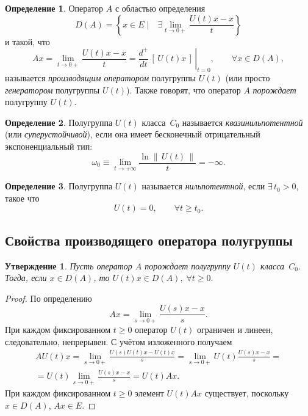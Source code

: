 \documentclass{article}
\renewcommand{\ge}{\geqslant}
\newtheorem{statement}{Утверждение}
\theoremstyle{definition}
\newtheorem{definition}{Определение}
\begin{document}
\begin{definition} \label{generator}
	Оператор $A$ с областью определения
	\begin{equation*}
		D(A) = \left\{ x \in E \; \bigg| \quad \exists \lim\limits_{t \rightarrow 0+} \frac{U(t)x - x}{t} \right\} 
	\end{equation*}
	и такой, что
	\begin{equation*}
		Ax = \lim\limits_{t \rightarrow 0+} \frac{U(t)x - x}{t} = \left. \frac{d^+}{dt}\,[\, U(t) x \,] \,\right|_{t = 0}, 
		\qquad \forall x \in D(A),
	\end{equation*}
	называется \textit{производящим оператором} полугруппы $U(t)$ (или просто \textit{генератором} полугруппы $U(t)$).
	Также говорят, что оператор $ A $ \textit{порождает} полугруппу $U(t)$.
\end{definition}

\begin{definition} \label{quasi-nilpotent semigroup}
	Полугруппа $U(t)$ класса~$C_0$ называется \textit{квазинильпотентной} (или \textit{суперустойчивой}), 
	если она имеет бесконечный отрицательный экспоненциальный тип:
	\begin{equation*}
		\omega_0 \equiv \lim\limits_{t \rightarrow +\infty} \frac{\ln \|\, U(t) \, \|}{t} = -\infty.
	\end{equation*}
\end{definition}

\begin{definition} \label{nilpotent semigroup}
	Полугруппа $U(t)$ называется \textit{нильпотентной}, если \linebreak $\exists \, t_0 > 0$, такое что
	\begin{equation*}
		U(t) = 0, \qquad \forall t \ge t_0.
	\end{equation*}
\end{definition}
\subsection{Свойства производящего оператора полугруппы} \label{Generator}
\theoremstyle{definition}
\begin{statement} \label{U(t)x in D(A)}
	Пусть оператор $A$ порождает полугруппу $U(t)$ класса~$C_0$. Тогда,
	если $ x \in D(A) $, то $ U(t)x \in D(A), \; \forall t \ge 0. $
\end{statement}
\begin{proof}
	По определению
	\begin{equation*}
		Ax = \lim\limits_{s \rightarrow 0+} \frac{U(s)x - x}{s}.
	\end{equation*}
	При каждом фиксированном $t \ge 0$ оператор $U(t)$ ограничен и линеен, следовательно, непрерывен. С учётом изложенного получаем
	\begin{gather*}
		AU(t)x = \lim\limits_{s \rightarrow 0+} \frac{U(s)U(t)x - U(t)x}{s} = 
		\lim\limits_{s \rightarrow 0+} U(t)\frac{U(s)x - x}{s} = \\[3mm]
		= U(t)\lim\limits_{s \rightarrow 0+} \frac{U(s)x - x}{s} = U(t)Ax.
	\end{gather*}
	При каждом фиксированном $t \ge 0$ элемент $U(t)Ax$ существует, поскольку $x \in D(A)$, $Ax \in E$.
\end{proof}
\end{document}
